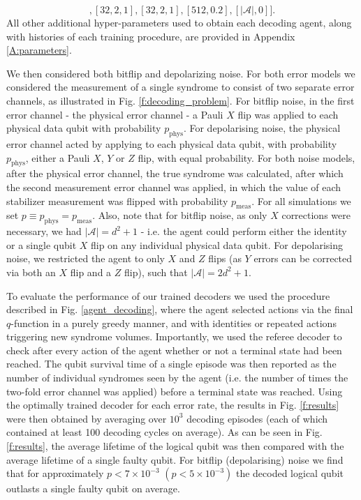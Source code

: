 \documentclass[twocolumn,preprintnumbers,amsmath,amssymb,notitlepage,nofootinbib,longbibliography,superscriptaddress,aps,pra,10pt]{revtex4-1}
\begin{document}
    \begin{equation}
        [[64,3,2],[32,2,1],[32,2,1],[512,0.2], [|\mathcal{A}|, 0]].
    \end{equation}
    All other additional hyper-parameters used to obtain each decoding agent, along with histories of each training procedure, are provided in Appendix \ref{A:parameters}.

    We then considered both bitflip and depolarizing noise. 
    For both error models we considered the measurement of a single syndrome to consist of two separate error channels, as illustrated in Fig. \ref{f:decoding_problem}. 
    For bitflip noise, in the first error channel - the physical error channel - a Pauli $X$ flip was applied to each physical data qubit with probability $p_{\mathrm{phys}}$. 
    For depolarising noise, the physical error channel acted by applying to each physical data qubit, with probability $p_{\mathrm{phys}}$, either a Pauli $X$, $Y$ or $Z$ flip, with equal probability.
    For both noise models, after the physical error channel, the true syndrome was calculated, after which the second measurement error channel was applied, in which the value of each stabilizer measurement was flipped with probability $p_{\mathrm{meas}}$. 
    For all simulations we set $p \equiv p_{\mathrm{phys}} = p_{\mathrm{meas}}$.
    Also, note that for bitflip noise, as only $X$ corrections were necessary, we had $|\mathcal{A}| = d^2 + 1$ - i.e. the agent could perform either the identity or a single qubit $X$ flip on any individual physical data qubit.
    For depolarising noise, we restricted the agent to only $X$ and $Z$ flips (as $Y$ errors can be corrected via both an $X$ flip and a $Z$ flip), such that $|\mathcal{A}| = 2d^2 + 1$.

    To evaluate the performance of our trained decoders we used the procedure described in Fig. \ref{agent_decoding}, where the agent selected actions via the final $q$-function in a purely greedy manner, and with identities or repeated actions triggering new syndrome volumes.
    Importantly, we used the referee decoder to check after every action of the agent whether or not a terminal state had been reached.
    The qubit survival time of a single episode was then reported as the number of individual syndromes seen by the agent (i.e. the number of times the two-fold error channel was applied) before a terminal state was reached.
    Using the optimally trained decoder for each error rate, the results in Fig. \ref{f:results} were then obtained by averaging over $10^3$ decoding episodes (each of which contained at least 100 decoding cycles on average). 
    As can be seen in Fig. \ref{f:results}, the average lifetime of the logical qubit was then compared with the average lifetime of a single faulty qubit.
    For bitflip (depolarising) noise we find that for approximately $p < 7\times 10^{-3}$  $(p < 5\times 10^{-3})$ the decoded logical qubit outlasts a single faulty qubit on average.
\end{document}
